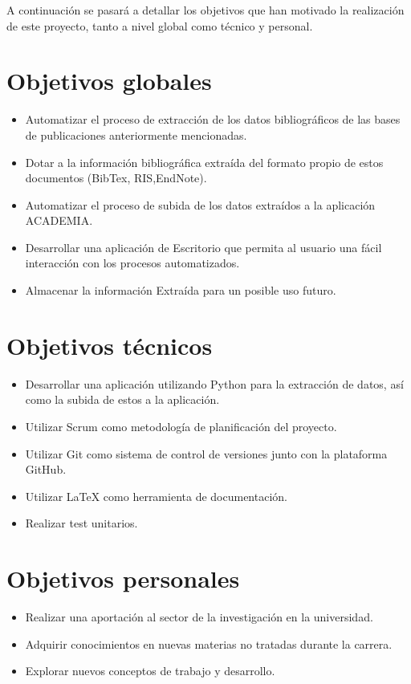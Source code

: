 
A continuación se pasará a detallar los objetivos que han motivado la realización de este proyecto, tanto a nivel global como técnico y personal.

\section{Objetivos globales}

\begin{itemize}
	\item Automatizar el proceso de extracción de los datos bibliográficos de las bases de publicaciones anteriormente mencionadas.
	
	\item Dotar a la información bibliográfica extraída del formato propio de estos documentos (BibTex, RIS,EndNote).
	
	\item Automatizar el proceso de subida de los datos extraídos a la aplicación ACADEMIA.
	
	\item Desarrollar una aplicación de Escritorio que permita al usuario una fácil interacción con los procesos automatizados.
	
	\item Almacenar la información Extraída para un posible uso futuro.
\end{itemize}

\section{Objetivos técnicos}

\begin{itemize}
	\item Desarrollar una aplicación utilizando Python para la extracción de datos, así como la subida de estos a la aplicación.
	
	\item Utilizar Scrum como metodología de planificación del proyecto.
	
	\item Utilizar Git como sistema de control de versiones junto con la plataforma GitHub.
	\item Utilizar LaTeX como herramienta de documentación.
	
	\item Realizar test unitarios.
\end{itemize}

\section{Objetivos personales}

\begin{itemize}

	\item Realizar una aportación al sector de la investigación en la universidad.
	
	 \item Adquirir conocimientos en nuevas materias no tratadas durante la carrera.
	 
	 \item Explorar nuevos conceptos de trabajo y desarrollo.
	 
\end{itemize}
